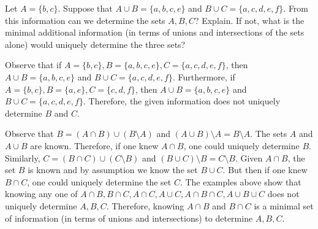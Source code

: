 \documentclass[11pt,letterpaper]{article}
\begin{document}
\newpage





 Let $A= \{ b, c \}$. Suppose that $A \cup B= \{ a, b, c, e \}$ and $B \cup C= \{ a, c, d, e, f \}$. From this information can we determine the sets $A, B, C$? Explain. If not, what is the minimal additional information (in terms of unions and intersections of the sets alone) would uniquely determine the three sets? \pspace

\sol Observe that if $A= \{ b, c \}, B= \{ a, b, c, e \}, C= \{ a, c, d, e, f \}$, then $A \cup B= \{ a, b, c, e \}$ and $B \cup C= \{ a, c, d, e, f \}$. Furthermore, if $A= \{ b, c \}, B= \{ a, e \}, C= \{ c, d, f \}$, then $A \cup B= \{ a, b, c, e \}$ and $B \cup C= \{ a, c, d, e, f \}$. Therefore, the given information does not uniquely determine $B$ and $C$. 

Observe that $B= (A \cap B) \cup (B \setminus A)$ and $(A \cup B) \setminus A= B \setminus A$. The sets $A$ and $A \cup B$ are known. Therefore, if one knew $A \cap B$, one could uniquely determine $B$. Similarly, $C= (B \cap C) \cup (C \setminus B)$ and $(B \cup C) \setminus B= C \setminus B$. Given $A \cap B$, the set $B$ is known and by assumption we know the set $B \cup C$. But then if one knew $B \cap C$, one could uniquely determine the set $C$. The examples above show that knowing any one of $A \cap B, B \cap C, A \cap C, A \cup C, A \cap B \cap C, A \cup B \cup C$ does not uniquely determine $A, B, C$. Therefore, knowing $A \cap B$ and $B \cap C$ is a minimal set of information (in terms of unions and intersections) to determine $A, B, C$. 
\end{document}
